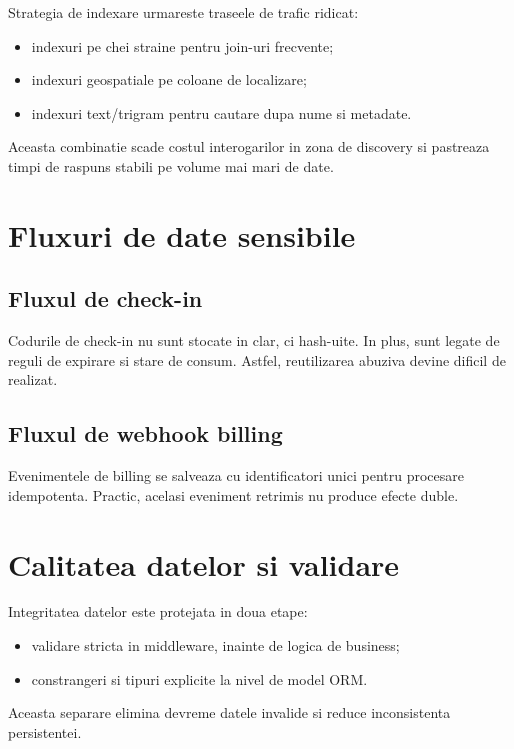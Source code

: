 Strategia de indexare urmareste traseele de trafic ridicat:
\begin{itemize}[leftmargin=1.2cm]
    \item indexuri pe chei straine pentru join-uri frecvente;
    \item indexuri geospatiale pe coloane de localizare;
    \item indexuri text/trigram pentru cautare dupa nume si metadate.
\end{itemize}

Aceasta combinatie scade costul interogarilor in zona de discovery si pastreaza timpi de raspuns stabili pe volume mai mari de date.

\section{Fluxuri de date sensibile}

\subsection{Fluxul de check-in}

Codurile de check-in nu sunt stocate in clar, ci hash-uite. In plus, sunt legate de reguli de expirare si stare de consum. Astfel, reutilizarea abuziva devine dificil de realizat.

\subsection{Fluxul de webhook billing}

Evenimentele de billing se salveaza cu identificatori unici pentru procesare idempotenta. Practic, acelasi eveniment retrimis nu produce efecte duble.

\section{Calitatea datelor si validare}

Integritatea datelor este protejata in doua etape:
\begin{itemize}[leftmargin=1.2cm]
    \item validare stricta in middleware, inainte de logica de business;
    \item constrangeri si tipuri explicite la nivel de model ORM.
\end{itemize}

Aceasta separare elimina devreme datele invalide si reduce inconsistenta persistentei.

